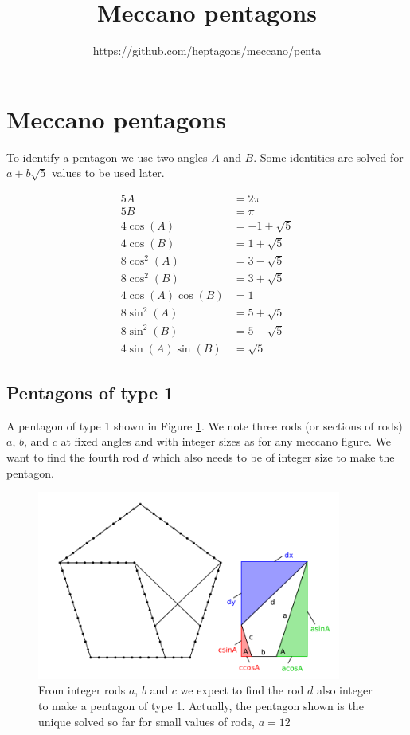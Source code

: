 \documentclass[11pt]{article}
\title{\textbf{Meccano pentagons}}
\author{https://github.com/heptagons/meccano/penta}
\date{}
\begin{document}
\maketitle

\section{Meccano pentagons}

To identify a pentagon we use two angles $A$ and $B$. Some identities are solved for $a + b\sqrt{5}$ values to be used later.

\begin{align*}
5A &= {2\pi} \\
5B &= {\pi} \\
4\cos(A) &=  -1 + \sqrt{5} \\
4\cos(B) &=   1 + \sqrt{5} \\
8\cos^2(A) &= { 3 - \sqrt{5}} \\
8\cos^2(B) &= { 3 + \sqrt{5}} \\
4\cos(A)\cos(B) &= 1 \\
8\sin^2(A) &= 5 + \sqrt{5} \\
8\sin^2(B) &= 5 - \sqrt{5} \\
4\sin(A)\sin(B) &= \sqrt{5}
\end{align*}

\subsection{Pentagons of type 1}
A pentagon of type 1 shown in Figure \ref{pentagon-type-1}. We note three rods (or sections of rods) $a$, $b$, and $c$ at fixed angles and with integer sizes as for any meccano figure. We want to find the fourth rod $d$ which also needs to be of integer size to make the pentagon.

\begin{figure}
\centering
\includegraphics[width=10cm]{pentagon-type-1}
\caption{From integer rods $a$, $b$ and $c$ we expect to find the rod $d$ also integer to make a pentagon of type 1. Actually, the pentagon shown is the unique solved so far for small values of rods, $a=12$}
\label{pentagon-type-1}
\end{figure}
\end{document}
